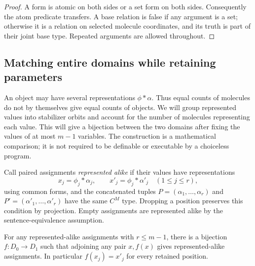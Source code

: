 \begin{proof}
A form is atomic on both sides or a set form on both sides.  Consequently
the atom predicate transfers.  A base relation is false if any argument
is a set; otherwise it is a relation on selected molecule coordinates,
and its truth is part of their joint base type.  Repeated arguments are
allowed throughout.
\end{proof}

\subsection{Matching entire domains while retaining parameters}

An object may have several representations $\phi*\alpha$. Thus equal
counts of molecules do not by themselves give equal counts of objects.
We will group represented values into stabilizer orbits and account for
the number of molecules representing each value. This will give a
bijection between the two domains after fixing the values of at most
$m-1$ variables. The construction is a mathematical comparison; it is
not required to be definable or executable by a choiceless program.

Call paired assignments \emph{represented alike} if their values have
representations
\[
 x_j=\phi_j*\alpha_j,\qquad x'_j=\phi_j*\alpha'_j
 \quad(1\leq j\leq r),
\]
using common forms, and the concatenated tuples
$P=(\alpha_1,\ldots,\alpha_r)$ and
$P'=(\alpha'_1,\ldots,\alpha'_r)$ have the same $C^M$ type.
Dropping a position preserves this condition by projection.  Empty
assignments are represented alike by the sentence-equivalence assumption.

\begin{lemma}
\label{lem:hf-bijection}
For any represented-alike assignments with $r\leq m-1$, there is a
bijection $f:D_0\longrightarrow D_1$ such that adjoining any pair
$x,f(x)$ gives represented-alike assignments.  In particular $f(x_j)=x'_j$
for every retained position.
\end{lemma}

